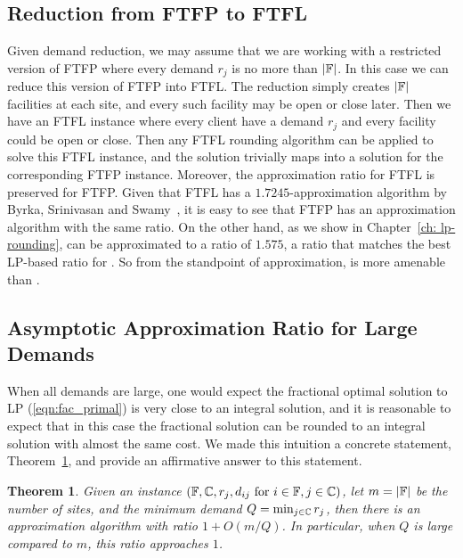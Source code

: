 \documentclass[oneside,final]{ucr}
\newtheorem{theorem}{Theorem}
\begin{document}
\subsection{Reduction from FTFP to FTFL}
Given demand reduction, we may assume that we are working
with a restricted version of FTFP where every demand $r_j$
is no more than $|\mathbb{F}|$. In this case we can reduce
this version of FTFP into FTFL. The reduction simply creates
$|\mathbb{F}|$ facilities at each site, and every such
facility may be open or close later. Then we have an FTFL
instance where every client have a demand $r_j$ and every
facility could be open or close. Then any FTFL rounding
algorithm can be applied to solve this FTFL instance, and
the solution trivially maps into a solution for the
corresponding FTFP instance. Moreover, the approximation
ratio for FTFL is preserved for FTFP. Given that FTFL has a
$1.7245$-approximation algorithm by Byrka, Srinivasan and
Swamy~\cite{ByrkaSS10}, it is easy to see that FTFP has an
approximation algorithm with the same ratio. On the other
hand, as we show in Chapter~\ref{ch: lp-rounding}, {\FTFP}
can be approximated to a ratio of $1.575$, a ratio that
matches the best LP-based ratio for {\UFL}. So from the
standpoint of approximation, {\FTFP} is more amenable than
{\FTFL}.

\subsection{Asymptotic Approximation Ratio for Large
  Demands}
When all demands are large, one would expect the fractional
optimal solution to LP (\ref{eqn:fac_primal}) is very close
to an integral solution, and it is reasonable to expect that
in this case the fractional solution can be rounded to an
integral solution with almost the same cost. We made this
intuition a concrete statement, Theorem~\ref{thm:largeR},
and provide an affirmative answer to this statement.

\begin{theorem}
  \label{thm:largeR}
  Given an {\FTFP} instance $(\mathbb{F}, \mathbb{C}, r_j,
  d_{ij} \text{ for } i\in\mathbb{F}, j\in\mathbb{C})$, let
  $m = |\mathbb{F}|$ be the number of sites, and the minimum
  demand $Q = \min_{j\in\mathbb{C}} r_j$, then there is an
  approximation algorithm with ratio $1 + O(m/Q)$. In
  particular, when $Q$ is large compared to $m$, this ratio
  approaches $1$.
\end{theorem}
\end{document}
